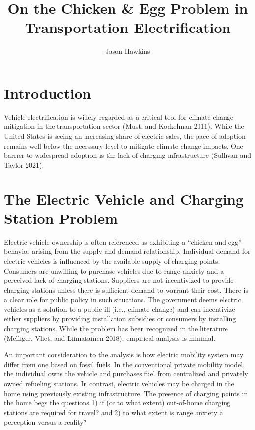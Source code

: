 \documentclass[
  letterpaper,
  DIV=11,
  numbers=noendperiod]{scrartcl}
\title{On the Chicken \& Egg Problem in Transportation Electrification}
\author{Jason Hawkins}
\date{}
\begin{document}
\maketitle
\ifdefined\Shaded\renewenvironment{Shaded}{\begin{tcolorbox}[interior hidden, frame hidden, enhanced, boxrule=0pt, borderline west={3pt}{0pt}{shadecolor}, sharp corners, breakable]}{\end{tcolorbox}}\fi

\hypertarget{introduction}{%
\section{Introduction}\label{introduction}}

Vehicle electrification is widely regarded as a critical tool for
climate change mitigation in the transportation sector (Musti and
Kockelman 2011). While the United States is seeing an increasing share
of electric sales, the pace of adoption remains well below the necessary
level to mitigate climate change impacts. One barrier to widespread
adoption is the lack of charging infrastructure (Sullivan and Taylor
2021).

\hypertarget{the-electric-vehicle-and-charging-station-problem}{%
\section{The Electric Vehicle and Charging Station
Problem}\label{the-electric-vehicle-and-charging-station-problem}}

Electric vehicle ownership is often referenced as exhibiting a ``chicken
and egg'' behavior arising from the supply and demand relationship.
Individual demand for electric vehicles is influenced by the available
supply of charging points. Consumers are unwilling to purchase vehicles
due to range anxiety and a perceived lack of charging stations.
Suppliers are not incentivized to provide charging stations unless there
is sufficient demand to warrant their cost. There is a clear role for
public policy in such situations. The government deems electric vehicles
as a solution to a public ill (i.e., climate change) and can incentivize
either suppliers by providing installation subsidies or consumers by
installing charging stations. While the problem has been recognized in
the literature (Melliger, Vliet, and Liimatainen 2018), empirical
analysis is minimal.

An important consideration to the analysis is how electric mobility
system may differ from one based on fossil fuels. In the conventional
private mobility model, the individual owns the vehicle and purchases
fuel from centralized and privately owned refueling stations. In
contrast, electric vehicles may be charged in the home using previously
existing infrastructure. The presence of charging points in the home
begs the questions 1) if (or to what extent) out-of-home charging
stations are required for travel? and 2) to what extent is range anxiety
a perception versus a reality?
\end{document}
